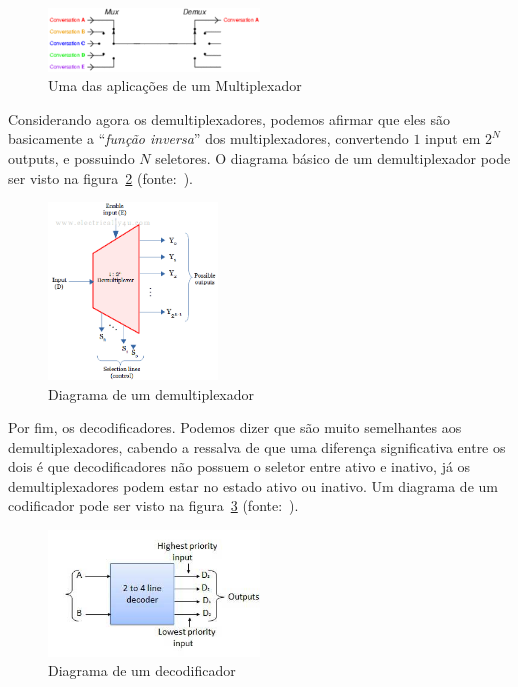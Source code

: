 \documentclass[12pt]{article}
\begin{document}
\begin{figure}[H]
  \centering
  \includegraphics[width=0.5\textwidth]{Exp06/Images/mux_demux.png}
  \caption{Uma das aplicações de um Multiplexador}\label{fig:mux_demux.png}
\end{figure}

Considerando agora os demultiplexadores, podemos afirmar que eles são
basicamente a ``\emph{função inversa}'' dos multiplexadores, convertendo $1$
input em $2^{N}$ outputs, e possuindo $N$ seletores. O diagrama básico de um
demultiplexador pode ser visto na figura~\ref{fig:demux.png}
(fonte:~\cite{web_demux}).

\begin{figure}[H]
  \centering
  \includegraphics[width=0.4\textwidth]{Exp06/Images/demux.png}
  \caption{Diagrama de um demultiplexador}\label{fig:demux.png}
\end{figure}

Por fim, os decodificadores. Podemos dizer que são muito semelhantes aos
demultiplexadores, cabendo a ressalva de que uma diferença significativa entre
os dois é que decodificadores não possuem o seletor entre ativo e inativo, já os
demultiplexadores podem estar no estado ativo ou inativo. Um diagrama de um
codificador pode ser visto na figura~\ref{fig:decoder.png}
(fonte:~\cite{web_decoder}).

\begin{figure}[H]
  \centering
  \includegraphics[width=0.5\textwidth]{Exp06/Images/decoder.png}
  \caption{Diagrama de um decodificador}\label{fig:decoder.png}
\end{figure}
\end{document}
